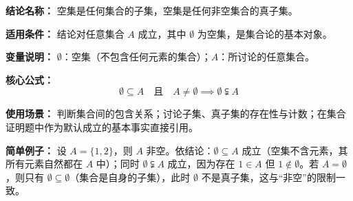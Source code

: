 \textbf{结论名称：} 空集是任何集合的子集，空集是任何非空集合的真子集。

\textbf{适用条件：} 结论对任意集合 \(A\) 成立，其中 \(\emptyset\) 为空集，是集合论的基本对象。

\textbf{变量说明：} \(\emptyset\)：空集（不包含任何元素的集合）；\(A\)：所讨论的任意集合。

\textbf{核心公式：}
\[
\boxed{\emptyset \subseteq A \quad \text{且} \quad A \neq \emptyset \implies \emptyset \subsetneqq A}
\]

\textbf{使用场景：} 判断集合间的包含关系；讨论子集、真子集的存在性与计数；在集合证明题中作为默认成立的基本事实直接引用。

\textbf{简单例子：} 设 \(A = \{1, 2\}\)，则 \(A\) 非空。依结论：\(\emptyset \subseteq A\) 成立（空集不含元素，其所有元素自然都在 \(A\) 中）；同时 \(\emptyset \subsetneqq A\) 成立，因为存在 \(1 \in A\) 但 \(1 \notin \emptyset\)。若 \(A = \emptyset\)，则只有 \(\emptyset \subseteq \emptyset\)（集合是自身的子集），此时 \(\emptyset\) 不是真子集，这与“非空”的限制一致。